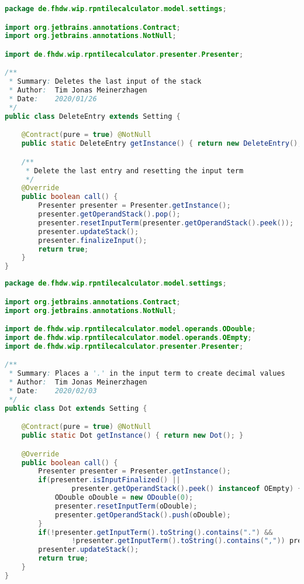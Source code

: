 \begin{lstlisting}[caption=DeleteEntry (Meinerzhagen),label=list:DeleteEntry,language=Java]
package de.fhdw.wip.rpntilecalculator.model.settings;

import org.jetbrains.annotations.Contract;
import org.jetbrains.annotations.NotNull;

import de.fhdw.wip.rpntilecalculator.presenter.Presenter;

/**
 * Summary: Deletes the last input of the stack
 * Author:  Tim Jonas Meinerzhagen
 * Date:    2020/01/26
 */
public class DeleteEntry extends Setting {

    @Contract(pure = true) @NotNull
    public static DeleteEntry getInstance() { return new DeleteEntry(); }

    /**
     * Delete the last entry and resetting the input term
     */
    @Override
    public boolean call() {
        Presenter presenter = Presenter.getInstance();
        presenter.getOperandStack().pop();
        presenter.resetInputTerm(presenter.getOperandStack().peek());
        presenter.updateStack();
        presenter.finalizeInput();
        return true;
    }
}
\end{lstlisting}    

\begin{lstlisting}[caption=Dot (Meinerzhagen),label=list:Dot,language=Java]
package de.fhdw.wip.rpntilecalculator.model.settings;

import org.jetbrains.annotations.Contract;
import org.jetbrains.annotations.NotNull;

import de.fhdw.wip.rpntilecalculator.model.operands.ODouble;
import de.fhdw.wip.rpntilecalculator.model.operands.OEmpty;
import de.fhdw.wip.rpntilecalculator.presenter.Presenter;

/**
 * Summary: Places a '.' in the input term to create decimal values
 * Author:  Tim Jonas Meinerzhagen
 * Date:    2020/02/03
 */
public class Dot extends Setting {

    @Contract(pure = true) @NotNull
    public static Dot getInstance() { return new Dot(); }

    @Override
    public boolean call() {
        Presenter presenter = Presenter.getInstance();
        if(presenter.isInputFinalized() ||
                presenter.getOperandStack().peek() instanceof OEmpty) {
            ODouble oDouble = new ODouble(0);
            presenter.resetInputTerm(oDouble);
            presenter.getOperandStack().push(oDouble);
        }
        if(!presenter.getInputTerm().toString().contains(".") &&
                !presenter.getInputTerm().toString().contains(",")) presenter.getInputTerm().append(".");
        presenter.updateStack();
        return true;
    }
}
\end{lstlisting}    

